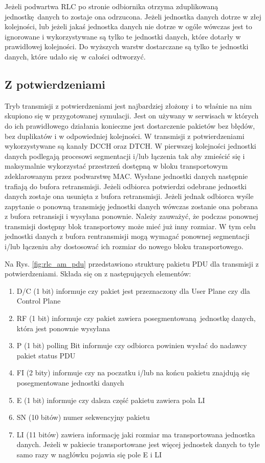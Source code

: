  Jeżeli podwartwa RLC po stronie odbiornika otrzyma zduplikowaną jednostkę danych to zostaje ona odrzucona. Jeżeli jednostka danych dotrze w złej kolejności, lub jeżeli jakaś jednostka danych nie dotrze w ogóle wówczas jest to ignorowane i wykorzystywane są tylko te jednostki danych, które dotarły w prawidłowej kolejności. Do wyższych warstw dostarczane są tylko te jednostki danych, które udało się w całości odtworzyć. 

\subsection{Z potwierdzeniami}
\label{subsec:am}

Tryb transmisji z potwierdzeniami jest najbardziej złożony i to właśnie na nim skupiono się w przygotowanej symulacji. Jest on używany w serwisach w których do ich prawidłowego działania konieczne jest dostarczenie pakietów bez błędów, bez duplikatów i w odpowiedniej kolejności. W transmisji z potwierdzeniami wykorzystywane są kanały DCCH oraz DTCH. W pierwszej kolejności jednostki danych podlegają procesowi segmentacji i/lub łączenia tak aby zmieścić się i maksymalnie wykorzystać przestrzeń dostępną w bloku transportowym zdeklarowanym przez podwarstwę MAC. Wysłane jednostki danych następnie trafiają do bufora retransmisji. Jeżeli odbiorca potwierdzi odebrane jednostki danych zostaje ona usunięta z bufora retransmisji. Jeżeli jednak odbiorca wyśle zapytanie o ponowną transmisję jednostki danych wówczas zostanie ona pobrana z bufora retransisji i wysyłana ponownie. Należy zauważyć, że podczas ponownej transmisji dostępny blok transportowy może mieć już inny rozmiar. W tym celu jednostki danych z bufora rentransmisji mogą wymagać ponownej segmentacji i/lub łączeniu aby dostosować ich rozmiar do nowego bloku transportowego.

Na Rys. \ref{fig:rlc_am_pdu} przedstawiono strukturę pakietu PDU dla transmisji z potwierdzeniami. Składa się on z następujących elementów:

\begin{enumerate}
	\item D/C (1 bit) informuje czy pakiet jest przeznaczony dla User Plane czy dla Control Plane
	\item RF (1 bit) informuje czy pakiet zawiera posegmentowaną jednostkę danych, która jest ponownie wysyłana
	\item P (1 bit) polling Bit informuje czy odbiorca powinien wysłać do nadawcy pakiet status PDU
	\item FI (2 bity) informuje czy na poczatku i/lub na końcu pakietu znajdują się posegmentowane jednostki danych
	\item E (1 bit) informuje czy dalsza część pakietu zawiera pola LI
	\item SN (10 bitów) numer sekwencyjny pakietu
	\item LI (11 bitów) zawiera informację jaki rozmiar ma transportowana jednostka danych. Jeżeli w pakiecie transportowane jest więcej jednostek danych to tyle samo razy w nagłówku pojawia się pole E i LI
\end{enumerate}

